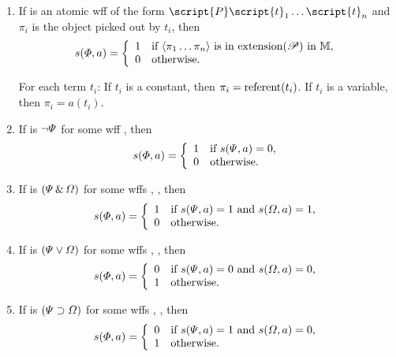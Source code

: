 \begin{enumerate}
\item If \metaA{} is an atomic wff of the form $\script{P}\script{t}_1\ldots\script{t}_n$ and $\pi_i$ is the object picked out by $t_i$, then
\begin{displaymath}s(\varPhi{}, a) =
	\left\{\begin{array}{ll}
	1 & \mbox{if ${\langle}\pi_1\ldots\pi_n{\rangle}$ is in \ensuremath{\mbox{extension}(\mathscr{P})} in \ensuremath{\mathbb{M}}},\\
	0 & \mbox{otherwise.}
	\end{array}\right.
\end{displaymath}

For each term $t_i$: If $t_i$ is a constant, then $\pi_i = \mbox{referent}(t_i)$. If $t_i$ is a variable, then $\pi_i = a(t_i)$.

\item If \metaA{} is ${\neg}\varPsi{}$ for some wff \metaB{}, then
\begin{displaymath}s(\varPhi{}, a) =
	\left\{\begin{array}{ll}
	1 & \mbox{if $s(\varPsi{}, a) = 0$},\\
	0 & \mbox{otherwise.}
	\end{array}\right.
\end{displaymath}

\item If \metaA{} is $(\varPsi{}\,\&\,\varOmega{})$ for some wffs \metaA{}, \metaB{}, then
\begin{displaymath}s(\varPhi{}, a) =
	\left\{\begin{array}{ll}
	1 & \mbox{if $s(\varPsi{}, a) = 1$ and $s(\varOmega{}, a) = 1$,}\\
	0 & \mbox{otherwise.}
	\end{array}\right.
\end{displaymath}

\item If \metaA{} is $(\varPsi{}\vee\varOmega{})$ for some wffs \metaA{}, \metaB{}, then
\begin{displaymath}s(\varPhi{}, a) =
	\left\{\begin{array}{ll}
	0 & \mbox{if $s(\varPsi{}, a) = 0$  and $s(\varOmega{}, a) = 0$,}\\
	1 & \mbox{otherwise.}
	\end{array}\right.
\end{displaymath}

\item If \metaA{} is $(\varPsi{}\supset\varOmega{})$ for some wffs \metaA{}, \metaB{}, then
\begin{displaymath}s(\varPhi{}, a) =
	\left\{\begin{array}{ll}
	0 & \mbox{if $s(\varPsi{}, a) = 1$ and $s(\varOmega{}, a) = 0$,}\\
	1 & \mbox{otherwise.}
	\end{array}\right.
\end{displaymath}


\end{enumerate}
